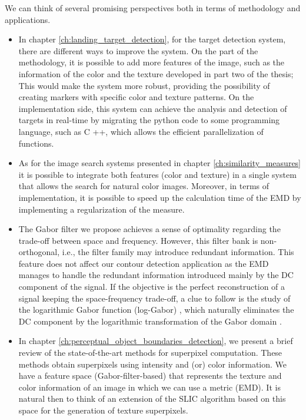 We can think of several promising perspectives both in terms of methodology and applications.

\begin{itemize}
	\item In chapter \ref{ch:landing_target_detection}, for the target detection system, there are different ways to improve the system. On the part of the methodology, it is possible to add more features of the image, such as the information of the color and the texture developed in part two of the thesis; This would make the system more robust, providing the possibility of creating markers with specific color and texture patterns. On the implementation side, this system can achieve the analysis and detection of targets in real-time by migrating the python code to some programming language, such as C ++, which allows the efficient parallelization of functions.
	
	 \item As for the image search systems presented in chapter \ref{ch:similarity_measures} it is possible to integrate both features (color and texture) in a single system that allows the search for natural color images. Moreover, in terms of implementation, it is possible to speed up the calculation time of the EMD by implementing a regularization of the measure.
	 
	 \item The Gabor filter we propose achieves a sense of optimality regarding the trade-off between space and frequency. However, this filter bank is non-orthogonal, i.e., the filter family may introduce redundant information. This feature does not affect our contour detection application as the EMD manages to handle the redundant information introduced mainly by the DC component of the signal.  If the objective is the perfect reconstruction of a signal keeping the space-frequency trade-off, a clue to follow is the study of the logarithmic Gabor function (log-Gabor) \citep{Field:OSA:1987}, which naturally eliminates the DC component by the logarithmic transformation of the Gabor domain \citep{Boukerroui.Noble.ea:JMIV:2004}.
	 
	 \item In chapter \ref{ch:perceptual_object_boundaries_detection}, we present a brief review of the state-of-the-art methods for superpixel computation. These methods obtain superpixels using intensity and (or) color information. We have a feature space (Gabor-filter-based) that represents the texture and color information of an image in which we can use a metric (EMD). It is natural then to think of an extension of the SLIC algorithm based on this space for the generation of texture superpixels. 
	 

\end{itemize}
